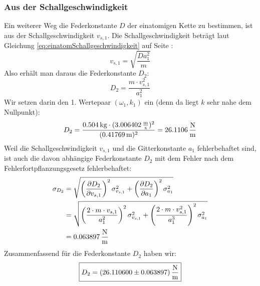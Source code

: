 \documentclass[a4paper,titlepage]{scrartcl}
\numberwithin{equation}{section}
\begin{document}
\subsubsection{Aus der Schallgeschwindigkeit}
Ein weiterer Weg die Federkonstante $D$ der einatomigen Kette zu bestimmen, ist aus der Schallgeschwindigkeit $v_{s,1}$. Die Schallgeschwindigkeit beträgt laut Gleichung \ref{eq:einatomSchallgeschwindigkeit} auf Seite \pageref{eq:einatomSchallgeschwindigkeit}:
\begin{equation*}
v_{s,1}=\sqrt{\frac{D a_1^2}{m}}
\end{equation*}
Also erhält man daraus die Federkonstante $D_2$:
\begin{equation*}
D_2=\frac{m \cdot v_{s,1}^2}{a_1^2}
\end{equation*}
Wir setzen darin den 1. Wertepaar $(\omega_1, k_1)$ ein (denn da liegt $k$ sehr nahe dem Nullpunkt):
\begin{equation*}
D_2=\frac{\unit[0.504]{kg} \cdot (\unit[3.006402]{\frac{m}{s}})^2}{(\unit[0.41769]{m})^2}=\unit[26.1106]{\frac{N}{m}}
\end{equation*}
Weil die Schallgeschwindigkeit $v_{s,1}$ und die Gitterkonstante $a_1$ fehlerbehaftet sind, ist auch die davon abhängige Federkonstante $D_2$ mit dem Fehler nach dem Fehlerfortpflanzungsgesetz fehlerbehaftet:
\begin{align*}
\sigma_{D_2}&=\sqrt{ \left( \frac{\partial D_2}{\partial v_{s,1}} \right)^2 \sigma^2_{v_{s,1}} + \left( \frac{\partial D_2}{\partial a_1} \right)^2 \sigma^2_{a_1}}\\
&=\sqrt{ \left( \frac{2 \cdot m \cdot v_{s,1}}{a^2_1} \right)^2 \sigma^2_{v_{s,1}} + \left( \frac{2 \cdot m \cdot v^2_{s,1}}{a_1^3} \right)^2 \sigma^2_{a_1}}\\
&=\unit[0.063897]{\frac{N}{m}}
\end{align*}
Zusammenfassend für die Federkonstante $D_2$ haben wir:
\begin{equation*}
\boxed{D_2=\unit[(26.110600 \pm 0.063897)]{\frac{N}{m}}}
\end{equation*}
\end{document}
